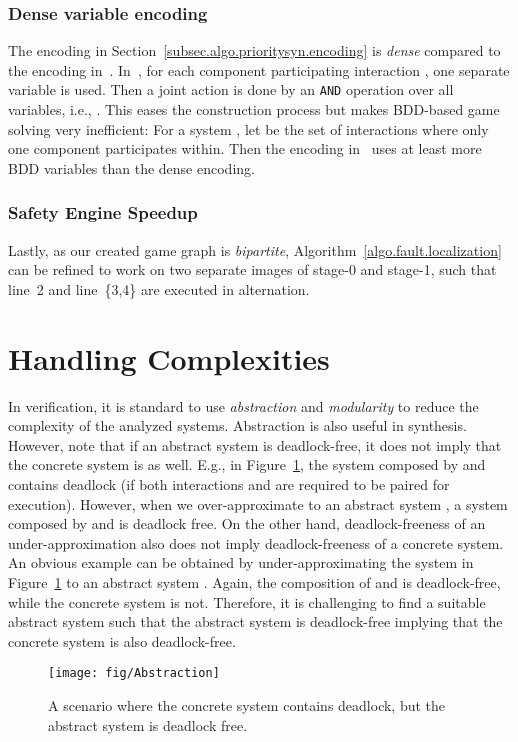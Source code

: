 \documentclass[10pt, a4paper, onecolumn, conference, compsocconf]{IEEEtran}
\begin{document}
\subsubsection{Dense variable encoding} The encoding in Section~\ref{subsec.algo.prioritysyn.encoding} is \emph{dense} compared to the encoding in~\cite{cheng:vissbip:2011}. In~\cite{cheng:vissbip:2011}, for each component  participating interaction , one separate variable  is used. Then a joint action is done by an \texttt{AND} operation over all variables, i.e., . This eases the construction process but makes BDD-based game solving very inefficient: For a system , let  be the set of interactions where only one component participates within. Then the encoding in~\cite{cheng:vissbip:2011} uses at least  more BDD variables than the dense encoding.

\subsubsection{Safety Engine Speedup} Lastly, as our created game graph is \emph{bipartite}, Algorithm~\ref{algo.fault.localization} can be refined to work on two separate images of stage-0 and stage-1, such that line~2 and line~\{3,4\} are executed in alternation.


\section{Handling Complexities\label{sec.algo.prioritysyn.complexities}}


In verification, it is standard to use \emph{abstraction} and \emph{modularity} to reduce the complexity of the analyzed systems.
Abstraction is also useful in synthesis.
However, note that if an abstract system is deadlock-free, it does not imply that the concrete system is as well.
E.g., in Figure~\ref{fig:vissbip.abstraction}, the system composed by  and  contains deadlock (if both interactions  and  are required to be paired for execution). However, when we over-approximate  to an abstract system , a system composed by  and  is deadlock free. On the other hand, deadlock-freeness of an under-approximation also does not imply deadlock-freeness of a concrete system. An obvious example can be obtained by under-approximating the system  in Figure~\ref{fig:vissbip.abstraction} to an abstract system . Again, the composition of  and  is deadlock-free, while the concrete system is not.
Therefore, it is challenging to find a suitable abstract system such that the abstract system is deadlock-free implying that the concrete system is also deadlock-free.
\begin{figure}[h]
\centering
 \texttt{[image: fig/Abstraction]}
  \caption{A scenario where the concrete system contains deadlock, but the abstract system is deadlock free.}
 \label{fig:vissbip.abstraction}
\end{figure}
\end{document}

